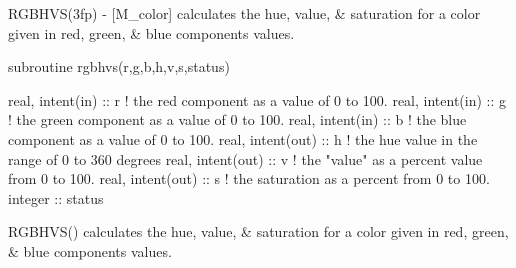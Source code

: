 \begin{DoxyDescription}
\item[\label{_RGBHVS}%
N\+A\+ME ]R\+G\+B\+H\+V\+S(3fp) -\/ \mbox{[}M\+\_\+color\mbox{]} calculates the hue, value, \& saturation for a color given in red, green, \& blue components values. 


\item[S\+Y\+N\+O\+P\+S\+IS ]
\begin{DoxyPre}
    subroutine rgbhvs(r,g,b,h,v,s,status)\end{DoxyPre}



\begin{DoxyPre}     real, intent(in)  :: r ! the red component as a value of 0 to 100.
     real, intent(in)  :: g ! the green component as a value of 0 to 100.
     real, intent(in)  :: b ! the blue component as a value of 0 to 100.
     real, intent(out) :: h ! the hue value in the range of 0 to 360 degrees
     real, intent(out) :: v ! the "value" as a percent value from 0 to 100.
     real, intent(out) :: s ! the saturation as a percent from 0 to 100.
     integer           :: status
    
\begin{DoxyPre}
 \end{DoxyPre}
\end{DoxyPre}



\begin{DoxyPre}
\begin{DoxyPre} \end{DoxyPre}
\end{DoxyPre}

\item[D\+E\+S\+C\+R\+I\+P\+T\+I\+ON ]
\begin{DoxyPre}
\begin{DoxyPre}\end{DoxyPre}
\end{DoxyPre}



\begin{DoxyPre}
\begin{DoxyPre} RGBHVS() calculates the hue, value, \& saturation
 for a color given in red, green, \& blue components values.
 ~\newline
~\newline
\end{DoxyPre}
\end{DoxyPre}




\end{DoxyDescription}
